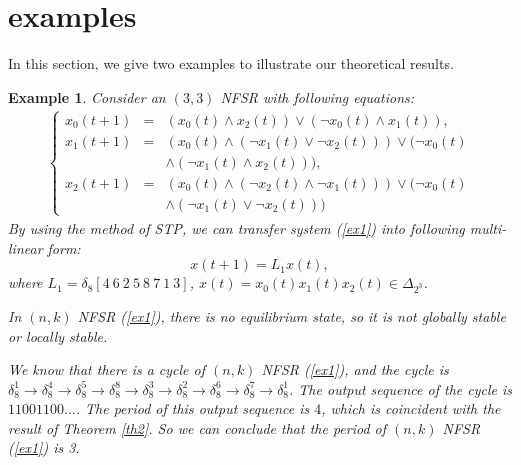 \documentclass[conference]{IEEEtran}
\newtheorem{example}{Example}
\begin{document}
\section{examples}
In this section, we give two examples to illustrate our theoretical results.
\begin{example}
Consider an $(3,3)$ NFSR with following equations:
\begin{eqnarray}\label{ex1}
 \left\{ \begin{array}{lcl}
x_0(t+1)&=&(x_0(t)\wedge x_2(t))\vee (\neg x_0(t)\wedge x_1(t)),\\
x_1(t+1)&=&(x_0(t)\wedge (\neg x_1(t)\vee \neg x_2(t)))\vee(\neg x_0(t)\\
&&\wedge(\neg x_1(t)\wedge x_2(t))),\\
x_{2}(t+1)&=&(x_0(t)\wedge (\neg x_2(t)\wedge \neg x_1(t)))\vee(\neg x_0(t)\\
&&\wedge(\neg x_1(t)\vee \neg x_2(t)))
\end{array} \right.
\end{eqnarray}
By using the method of STP, we can transfer system (\ref{ex1}) into following multi-linear form:
\begin{equation}
x(t+1)=L_1x(t),
\end{equation}
where $L_1=\delta_{8}[4~6~2~5~8~7~1~3]$, $x(t)=x_0(t)x_1(t)x_2(t)\in \Delta_{2^3}$.

In $(n,k)$ NFSR (\ref{ex1}), there is no equilibrium state, so it is not globally stable or locally stable.

We know that there is a cycle of $(n,k)$ NFSR (\ref{ex1}), and the cycle is $\delta^1_8\rightarrow \delta^4_8\rightarrow \delta^5_8\rightarrow \delta^8_8\rightarrow \delta^3_8\rightarrow \delta^2_8\rightarrow \delta^6_8\rightarrow \delta^7_8\rightarrow \delta^1_8$. The output sequence of the cycle is $11001100...$. The period of this output sequence is $4$, which is coincident with the result of Theorem {\ref{th2}}. So we can conclude that the period of $(n,k)$ NFSR (\ref{ex1}) is 3.
\end{example}
\end{document}
